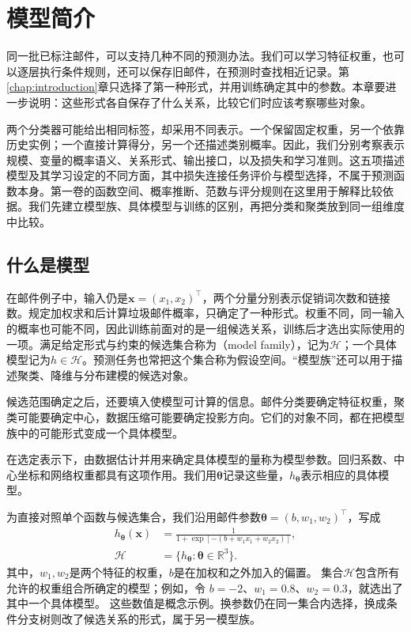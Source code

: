 \chapter{模型简介}
\label{chap:machine-learning-models}

同一批已标注邮件，可以支持几种不同的预测办法。我们可以学习特征权重，也可以逐层执行条件规则，还可以保存旧邮件，在预测时查找相近记录。第\ref{chap:introduction}章只选择了第一种形式，并用训练确定其中的参数。本章要进一步说明：这些形式各自保存了什么关系，比较它们时应该考察哪些对象。

两个分类器可能给出相同标签，却采用不同表示。一个保留固定权重，另一个依靠历史实例；一个直接计算得分，另一个还描述类别概率。因此，我们分别考察表示规模、变量的概率语义、关系形式、输出接口，以及损失和学习准则。这五项描述模型及其学习设定的不同方面，其中损失连接任务评价与模型选择，不属于预测函数本身。第一卷的函数空间、概率推断、范数与评分规则在这里用于解释比较依据。我们先建立模型族、具体模型与训练的区别，再把分类和聚类放到同一组维度中比较。

\section{什么是模型}
\label{sec:models-meaning}

在邮件例子中，输入仍是$\bm{x}=(x_1,x_2)^{\top}$，两个分量分别表示促销词次数和链接数。规定加权求和后计算垃圾邮件概率，只确定了一种形式。权重不同，同一输入的概率也可能不同，因此训练前面对的是一组候选关系，训练后才选出实际使用的一项。满足给定形式与约束的候选集合称为（model family），记为$\mathcal H$；一个具体模型记为$h\in\mathcal H$。预测任务也常把这个集合称为假设空间。“模型族”还可以用于描述聚类、降维与分布建模的候选对象。

候选范围确定之后，还要填入使模型可计算的信息。邮件分类要确定特征权重，聚类可能要确定中心，数据压缩可能要确定投影方向。它们的对象不同，都在把模型族中的可能形式变成一个具体模型。

在选定表示下，由数据估计并用来确定具体模型的量称为模型参数。回归系数、中心坐标和网络权重都具有这项作用。我们用$\bm{\theta}$记录这些量，$h_{\bm{\theta}}$表示相应的具体模型。

为直接对照单个函数与候选集合，我们沿用邮件参数$\bm{\theta}=(b,w_1,w_2)^{\top}$，写成
\begin{equation}
  \begin{aligned}
    h_{\bm{\theta}}(\bm{x})
      &=\frac{1}{1+\exp[-(b+w_1x_1+w_2x_2)]},\\
    \mathcal{H}&=\{h_{\bm{\theta}}:\bm{\theta}\in\mathbb{R}^{3}\}.
  \end{aligned}
  \label{eq:models-family-example}
\end{equation}
其中，$w_1,w_2$是两个特征的权重，$b$是在加权和之外加入的偏置。
集合$\mathcal{H}$包含所有允许的权重组合所确定的模型；例如，令
$b=-2$、$w_1=0.8$、$w_2=0.3$，就选出了其中一个具体模型。
这些数值是概念示例。换参数仍在同一集合内选择，换成条件分支树则改了候选关系的形式，属于另一模型族。

